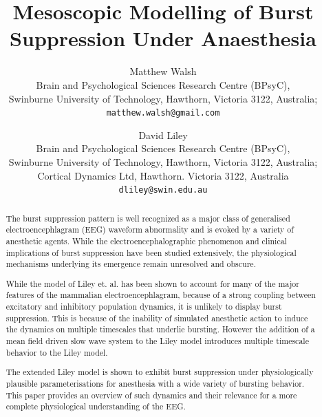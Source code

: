 \documentclass[a4paper,12pt]{article}
\begin{document}

\title{Mesoscopic Modelling of Burst Suppression Under Anaesthesia}
\author{Matthew Walsh\\
   \small Brain and Psychological Sciences Research Centre (BPsyC),\\
   \small Swinburne University of Technology, Hawthorn, Victoria 3122, Australia; \\
   \texttt{matthew.walsh@gmail.com}\\
  \and
    David Liley\\
   \small  Brain and Psychological Sciences Research Centre (BPsyC),\\
   \small Swinburne University of Technology, Hawthorn, Victoria 3122, Australia; \\
   \small Cortical Dynamics Ltd, Hawthorn. Victoria 3122, Australia\\
   \texttt{dliley@swin.edu.au}}
\maketitle

\begin{abstract}
The burst suppression pattern is well recognized as
a major class of generalised electroencephlagram (EEG) waveform abnormality 
and is evoked by a variety of anesthetic agents. 
While the electroencephalographic phenomenon and clinical
implications of burst suppression have been studied extensively, the physiological mechanisms
underlying its emergence remain unresolved and obscure. 

While the model of Liley et. al. has been shown to account for many of the major features of the 
mammalian electroencephlagram, because of a strong coupling between excitatory and inhibitory population dynamics,  
it is unlikely to display burst suppression. This is because of the inability of simulated anesthetic action 
to induce the dynamics on multiple timescales that underlie bursting.
However the addition of a mean field driven slow wave system to the Liley model introduces 
multiple timescale behavior to the Liley model.

The extended Liley model is shown to exhibit burst suppression under physiologically 
plausible parameterisations for anesthesia with a wide variety of bursting behavior. 
This paper provides an overview of such dynamics and their relevance for a more 
complete physiological understanding of the EEG.

\end{abstract}
\end{document}
